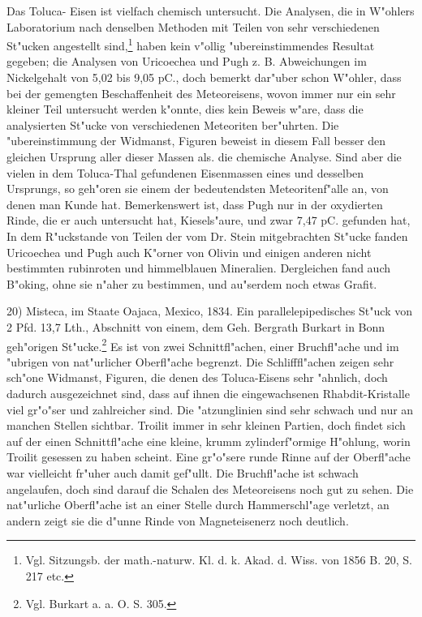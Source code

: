 \documentclass[a4paper, 11pt, oneside]{article}
\begin{document}
Das Toluca- Eisen ist vielfach chemisch untersucht. Die Analysen, die in W"ohlers Laboratorium nach denselben Methoden mit Teilen von sehr verschiedenen St"ucken angestellt sind,\footnote{Vgl. Sitzungsb. der math.-naturw. Kl. d. k. Akad. d. Wiss. von 1856 B. 20, S. 217 etc.} haben kein v"ollig "ubereinstimmendes Resultat gegeben; die Analysen von Uricoechea und Pugh z. B. Abweichungen im Nickelgehalt von 5,02 bis 9,05 pC., doch bemerkt dar"uber schon W"ohler, dass bei der gemengten Beschaffenheit des Meteoreisens, wovon immer nur ein sehr kleiner Teil untersucht werden k"onnte, dies kein Beweis w"are, dass die analysierten St"ucke von verschiedenen Meteoriten ber"uhrten. Die "ubereinstimmung der Widmanst, Figuren beweist in diesem Fall besser den gleichen Ursprung aller dieser Massen als. die chemische Analyse. Sind aber die vielen in dem Toluca-Thal gefundenen Eisenmassen eines und desselben Ursprungs, so geh"oren sie einem der bedeutendsten Meteoritenf"alle an, von denen man Kunde hat. Bemerkenswert ist, dass Pugh nur in der oxydierten Rinde, die er auch untersucht hat, Kiesels"aure, und zwar 7,47 pC. gefunden hat, In dem R"uckstande von Teilen der vom Dr. Stein mitgebrachten St"ucke fanden Uricoechea und Pugh auch K"orner von Olivin und einigen anderen nicht bestimmten rubinroten und himmelblauen Mineralien. Dergleichen fand auch B"oking, ohne sie n"aher zu bestimmen, und au"serdem noch etwas Grafit.

20) Misteca, im Staate Oajaca, Mexico, 1834. Ein parallelepipedisches St"uck von 2 Pfd. 13,7 Lth., Abschnitt von einem, dem Geh. Bergrath Burkart in Bonn geh"origen St"ucke.\footnote{Vgl. Burkart a. a. O. S. 305.} Es ist von zwei Schnittfl"achen, einer Bruchfl"ache und im "ubrigen von nat"urlicher Oberfl"ache begrenzt. Die Schlifffl"achen zeigen sehr sch"one Widmanst, Figuren, die denen des Toluca-Eisens sehr "ahnlich, doch dadurch ausgezeichnet sind, dass auf ihnen die eingewachsenen Rhabdit-Kristalle viel gr"o"ser und zahlreicher sind. Die "atzunglinien sind sehr schwach und nur an manchen Stellen sichtbar. Troilit immer in sehr kleinen Partien, doch findet sich auf der einen Schnittfl"ache eine kleine, krumm zylinderf"ormige H"ohlung, worin Troilit gesessen zu haben scheint. Eine gr"o"sere runde Rinne auf der Oberfl"ache war vielleicht fr"uher auch damit gef"ullt. Die Bruchfl"ache ist schwach angelaufen, doch sind darauf die Schalen des Meteoreisens noch gut zu sehen. Die nat"urliche Oberfl"ache ist an einer Stelle durch Hammerschl"age verletzt, an andern zeigt sie die d"unne Rinde von Magneteisenerz noch deutlich.
\end{document}
